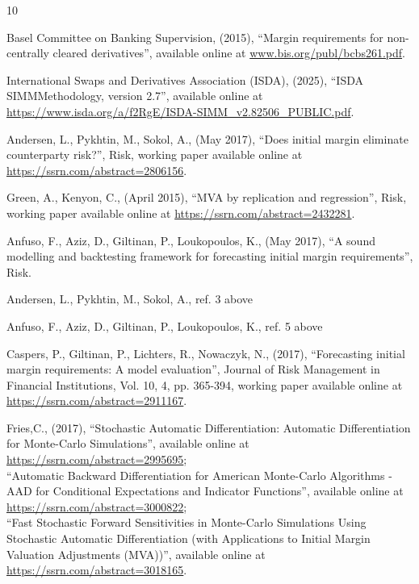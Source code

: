 \documentclass[11pt,a4paper,oneside]{article}
\begin{document}
\begin{thebibliography}{10}

  Basel Committee on Banking Supervision,
  (2015),
  ``Margin requirements for non-centrally cleared derivatives'',
  available online at \url{www.bis.org/publ/bcbs261.pdf}.

  International Swaps and Derivatives Association (ISDA),
  (2025),
  ``ISDA SIMM\texttrademark Methodology, version 2.7'',
  available online at \url{https://www.isda.org/a/f2RgE/ISDA-SIMM_v2.82506_PUBLIC.pdf}.

  Andersen, L., Pykhtin, M., Sokol, A.,
  (May 2017),
  ``Does initial margin eliminate counterparty risk?'',
  Risk,
  working paper available online at \url{https://ssrn.com/abstract=2806156}.

  Green, A., Kenyon, C.,
  (April 2015),
  ``MVA by replication and regression'',
  Risk, 
  working paper available online at \url{https://ssrn.com/abstract=2432281}.

  Anfuso, F., Aziz, D., Giltinan, P., Loukopoulos, K.,
  (May 2017),
  ``A sound modelling and backtesting framework for forecasting initial margin requirements'',
  Risk.

  Andersen, L., Pykhtin, M., Sokol, A., ref. 3 above

  Anfuso, F., Aziz, D., Giltinan, P., Loukopoulos, K., ref. 5 above

  Caspers, P., Giltinan, P., Lichters, R., Nowaczyk, N.,
  (2017),
  ``Forecasting initial margin requirements: A model evaluation'', 
  Journal of Risk Management in Financial Institutions, Vol. 10, 4, pp. 365-394,
  working paper available online at \url{https://ssrn.com/abstract=2911167}.

  Fries,C.,
  (2017),
  ``Stochastic Automatic Differentiation: Automatic Differentiation for Monte-Carlo Simulations'',
  available online at \url{https://ssrn.com/abstract=2995695};\\
  ``Automatic Backward Differentiation for American Monte-Carlo Algorithms - AAD for Conditional Expectations and Indicator Functions'',
  available online at \url{https://ssrn.com/abstract=3000822};\\
  ``Fast Stochastic Forward Sensitivities in Monte-Carlo Simulations Using Stochastic Automatic Differentiation (with Applications to Initial Margin Valuation Adjustments (MVA))'',
  available online at \url{https://ssrn.com/abstract=3018165}.


\end{thebibliography}
\end{document}
